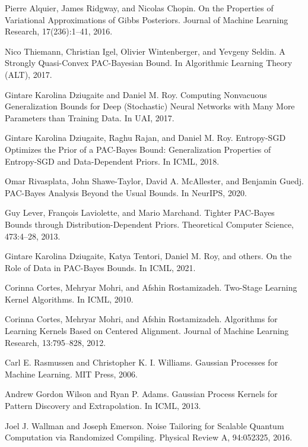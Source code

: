 \documentclass{article}
\begin{document}
\begin{thebibliography}{99}
Pierre Alquier, James Ridgway, and Nicolas Chopin. On the Properties of Variational Approximations of Gibbs Posteriors. Journal of Machine Learning Research, 17(236):1–41, 2016.

Nico Thiemann, Christian Igel, Olivier Wintenberger, and Yevgeny Seldin. A Strongly Quasi-Convex PAC-Bayesian Bound. In Algorithmic Learning Theory (ALT), 2017.

Gintare Karolina Dziugaite and Daniel M. Roy. Computing Nonvacuous Generalization Bounds for Deep (Stochastic) Neural Networks with Many More Parameters than Training Data. In UAI, 2017.

Gintare Karolina Dziugaite, Raghu Rajan, and Daniel M. Roy. Entropy-SGD Optimizes the Prior of a PAC-Bayes Bound: Generalization Properties of Entropy-SGD and Data-Dependent Priors. In ICML, 2018.

Omar Rivasplata, John Shawe-Taylor, David A. McAllester, and Benjamin Guedj. PAC-Bayes Analysis Beyond the Usual Bounds. In NeurIPS, 2020.

Guy Lever, François Laviolette, and Mario Marchand. Tighter PAC-Bayes Bounds through Distribution-Dependent Priors. Theoretical Computer Science, 473:4–28, 2013.

Gintare Karolina Dziugaite, Katya Tentori, Daniel M. Roy, and others. On the Role of Data in PAC-Bayes Bounds. In ICML, 2021.

Corinna Cortes, Mehryar Mohri, and Afshin Rostamizadeh. Two-Stage Learning Kernel Algorithms. In ICML, 2010.

Corinna Cortes, Mehryar Mohri, and Afshin Rostamizadeh. Algorithms for Learning Kernels Based on Centered Alignment. Journal of Machine Learning Research, 13:795–828, 2012.

Carl E. Rasmussen and Christopher K. I. Williams. Gaussian Processes for Machine Learning. MIT Press, 2006.

Andrew Gordon Wilson and Ryan P. Adams. Gaussian Process Kernels for Pattern Discovery and Extrapolation. In ICML, 2013.

Joel J. Wallman and Joseph Emerson. Noise Tailoring for Scalable Quantum Computation via Randomized Compiling. Physical Review A, 94:052325, 2016.


\end{thebibliography}
\end{document}
